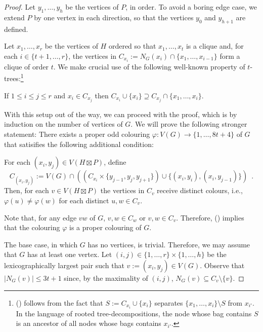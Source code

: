 \documentclass{patmorin}
\begin{document}
\begin{proof}
  Let $y_1,\ldots,y_h$ be the vertices of $P$, in order.  To avoid a boring edge case, we extend $P$ by one vertex in each direction, so that the vertices $y_0$ and $y_{h+1}$ are defined.

  Let $x_1,\ldots,x_r$ be the vertices of $H$ ordered so that $x_1,\ldots,x_{t}$ is a clique and, for each $i\in\{t+1,\ldots,r\}$, the vertices in $C_{x_i}:=N_G(x_i)\cap\{x_1,\ldots,x_{i-1}\}$ form a clique of order $t$.  We make crucial use of the following well-known property of $t$-trees:\footnote{() follows from the fact that $S:=C_{x_i}\cup\{x_i\}$ separates $\{x_1,\ldots,x_i\}\setminus S$ from $x_{i'}$.  In the language of rooted tree-decompositions, the node whose bag contains $S$ is an ancestor of all nodes whose bags contains $x_{i'}$.}
  \begin{compactitem}[(\ding{74})]
    \item If $1\le i \le j\le r$ and $x_i \in C_{x_{j}}$ then $C_{x_i}\cup\{x_i\}\supseteq C_{x_{j}}\cap\{x_1,\ldots,x_{i}\}$.
  \end{compactitem}

  With this setup out of the way, we can proceed with the proof, which is by induction on the number of vertices of $G$.  We will prove the following stronger statement:  There exists a proper odd colouring $\varphi:V(G)\to\{1,\ldots,8t+4\}$ of $G$ that satisifies the following additional condition:
  \begin{compactitem}[(\ding{96})]
    \item For each $(x_i,y_j)\in V(H\boxtimes P)$, define
    \[
      C_{(x_i,y_j)}:=V(G)\cap \left(\left(C_{x_i}\times\{y_{j-1}, y_{j},y_{j+1}\}\right)\cup\{(x_i,y_i),(x_i,y_{j-1})\}\right)
      \enspace .
    \]
    Then, for each $v\in V(H\boxtimes P)$ the vertices in $C_v$ receive distinct colours, i.e., $\varphi(u)\neq \varphi(w)$ for each distinct $u,w\in C_v$.
  \end{compactitem}
  Note that, for any edge $vw$ of $G$, $v,w \in C_w$ or $v,w\in C_v$.  Therefore, () implies that the colouring $\varphi$ is a proper colouring of $G$.

  The base case, in which $G$ has no vertices, is trivial. Therefore, we may assume that $G$ has at least one vertex.  Let $(i,j)\in\{1,\ldots,r\}\times\{1,\ldots,h\}$ be the lexicographically largest pair such that $v:=(x_i,y_j)\in V(G)$.  Observe that $|N_G(v)|\le 3t+1$ since, by the maximality of $(i,j)$,  $N_G(v)\subseteq C_v\setminus\{v\}$.


\end{proof}
\end{document}
